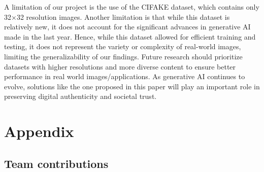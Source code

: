 A limitation of our project is the use of the CIFAKE dataset, which contains only 32×32 resolution images. Another limitation is that while this dataset is relatively new, it does not account for the significant advances in generative AI made in the last year. Hence, while this dataset allowed for efficient training and testing, it does not represent the variety or complexity of real-world images, limiting the generalizability of our findings. Future research should prioritize datasets with higher resolutions and more diverse content to ensure better performance in real world images/applications. As generative AI continues to evolve, solutions like the one proposed in this paper will play an important role in preserving digital authenticity and societal trust.




{\small


}

\vspace{0.2cm}
\section*{Appendix}

\vspace{0.3cm}

\subsection*{Team contributions}

\vspace{0.1cm}

